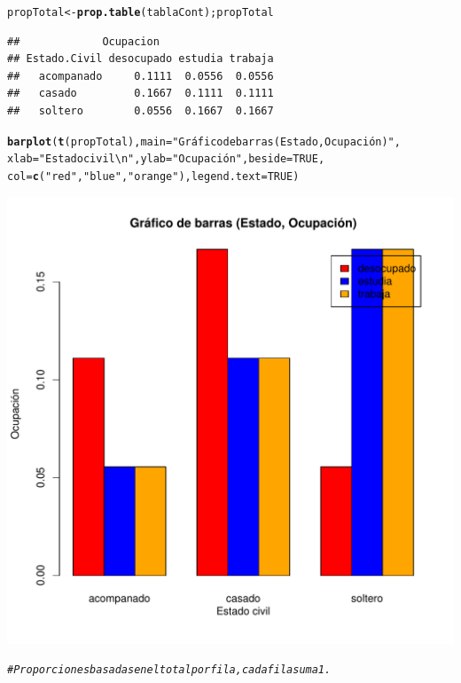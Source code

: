 \documentclass[12pt,letterpaper]{article}\usepackage[]{graphicx}\usepackage[]{color}
\makeatletter
\def\maxwidth{ %
  \ifdim\Gin@nat@width>\linewidth
    \linewidth
  \else
    \Gin@nat@width
  \fi
}
\newcommand{\hlnum}[1]{\textcolor[rgb]{0.686,0.059,0.569}{#1}}%
\newcommand{\hlstr}[1]{\textcolor[rgb]{0.192,0.494,0.8}{#1}}%
\newcommand{\hlcom}[1]{\textcolor[rgb]{0.678,0.584,0.686}{\textit{#1}}}%
\newcommand{\hlstd}[1]{\textcolor[rgb]{0.345,0.345,0.345}{#1}}%
\newcommand{\hlkwb}[1]{\textcolor[rgb]{0.69,0.353,0.396}{#1}}%
\newcommand{\hlkwc}[1]{\textcolor[rgb]{0.333,0.667,0.333}{#1}}%
\newcommand{\hlkwd}[1]{\textcolor[rgb]{0.737,0.353,0.396}{\textbf{#1}}}%
\newenvironment{kframe}{%
 \def\at@end@of@kframe{}%
 \ifinner\ifhmode%
  \def\at@end@of@kframe{\end{minipage}}%
  \begin{minipage}{\columnwidth}%
 \fi\fi%
 \def\FrameCommand##1{\hskip\@totalleftmargin \hskip-\fboxsep
 \colorbox{shadecolor}{##1}\hskip-\fboxsep
     \hskip-\linewidth \hskip-\@totalleftmargin \hskip\columnwidth}%
 \MakeFramed {\advance\hsize-\width
   \@totalleftmargin\z@ \linewidth\hsize
   \@setminipage}}%
 {\par\unskip\endMakeFramed%
 \at@end@of@kframe}
\newenvironment{knitrout}{}{} %
\makeatother
\begin{document}
\begin{enumerate}
\begin{knitrout}
\begin{kframe}
\begin{alltt}
\hlstd{propTotal} \hlkwb{<-} \hlkwd{prop.table}\hlstd{(tablaCont); propTotal}
\end{alltt}
\begin{verbatim}
##             Ocupacion
## Estado.Civil desocupado estudia trabaja
##   acompanado     0.1111  0.0556  0.0556
##   casado         0.1667  0.1111  0.1111
##   soltero        0.0556  0.1667  0.1667
\end{verbatim}
\begin{alltt}
\hlkwd{barplot}\hlstd{(}\hlkwd{t}\hlstd{(propTotal),} \hlkwc{main}\hlstd{=}\hlstr{"Gráfico de barras (Estado, Ocupación)"}\hlstd{,}
        \hlkwc{xlab}\hlstd{=}\hlstr{"Estado civil\textbackslash{}n"}\hlstd{,} \hlkwc{ylab}\hlstd{=}\hlstr{"Ocupación"}\hlstd{,} \hlkwc{beside}\hlstd{=}\hlnum{TRUE}\hlstd{,}
        \hlkwc{col}\hlstd{=}\hlkwd{c}\hlstd{(}\hlstr{"red"}\hlstd{,} \hlstr{"blue"}\hlstd{,} \hlstr{"orange"}\hlstd{),}\hlkwc{legend.text}\hlstd{=}\hlnum{TRUE}\hlstd{)}
\end{alltt}
\end{kframe}
\includegraphics[width=\maxwidth]{figure/unnamed-chunk-15-1} 

\end{knitrout}

\begin{knitrout}
\color{fgcolor}\begin{kframe}
\begin{alltt}
\hlcom{# Proporciones basadas en el total por fila, cada fila suma 1.}


\end{alltt}
\end{kframe}
\end{knitrout}
\end{enumerate}
\end{document}
